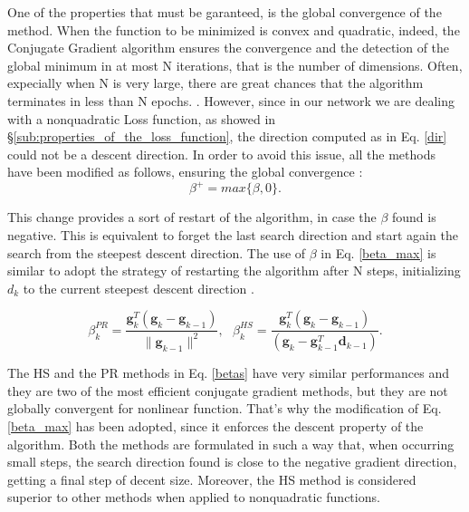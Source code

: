 			One of the properties that must be garanteed, is the global convergence of the method. When the function to be minimized is convex and quadratic, indeed, the Conjugate Gradient algorithm ensures the convergence and the detection of the global minimum in at most N iterations, that is the number of dimensions. Often, expecially when N is very large, there are great chances that the algorithm terminates in less than N epochs.
			\cite{DIXON-1975}.
			However, since in our network we are dealing with a nonquadratic Loss function, as showed in \S\ref{sub:properties_of_the_loss_function}, the direction computed as in Eq. \ref{dir} could not be a descent direction. In order to avoid this issue, all the methods have been modified as follows, ensuring the global convergence \cite{doi:10.1137/0802003}:
			\begin{equation}
			\label{beta_max}
				 \beta^+ = max\{\beta, 0\}.
			\end{equation}

			This change provides a sort of restart of the algorithm, in case the $\beta$ found is negative. This is equivalent to forget the last search direction and start again the search from the steepest descent direction. The use of $\beta$ in Eq. \ref{beta_max} is similar to adopt the strategy of restarting the algorithm after N steps, initializing $d_k$ to the current steepest descent direction
			\cite{MOLLER1993525,Gilbert-1992}.

			\begin{equation}
			\label{betas}
				 \beta^{PR}_k = \frac{\textbf{g}_k^T(\textbf{g}_k-\textbf{g}_{k-1})}{\|\textbf{g}_{k-1}\|^2}, \text{ }
 				 \beta^{HS}_k = \frac{\textbf{g}_k^T(\textbf{g}_k-\textbf{g}_{k-1})}{(\textbf{g}_k-\textbf{g}_{k-1}^T\textbf{d}_{k-1})}.
			\end{equation}

			The HS and the PR methods in Eq. \ref{betas} have very similar performances and they are two of the most efficient conjugate gradient methods, but they are not globally convergent for nonlinear function\cite{Griffiths-1984}. That's why the modification of Eq. \ref{beta_max} has been adopted\cite{Powell-1986}, since it enforces the descent property of the algorithm.
			Both the methods are formulated in such a way that, when occurring small steps, the search direction found is close to the negative gradient direction, getting a final step of decent size\cite{Gilbert-1992}.
			Moreover, the HS method is considered superior to other methods when applied to nonquadratic functions.

